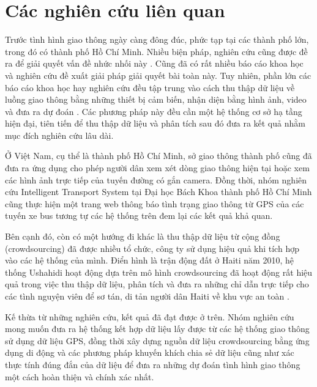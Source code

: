 \section{Các nghiên cứu liên quan}
Trước tình hình giao thông ngày càng đông đúc, phức tạp tại các thành phố lớn, trong đó có thành phố Hồ Chí Minh. Nhiều biện pháp, nghiên cứu cũng được đề ra để giải quyết vấn đề nhức nhối này \cite{FSPPM}. Cũng đã có rất nhiều báo cáo khoa học và nghiên cứu đề xuất giải pháp giải quyết bài toàn này. Tuy nhiên, phần lớn các báo cáo khoa học hay nghiên cứu đều tập trung vào cách thu thập dữ liệu về luồng giao thông bằng những thiết bị cảm biến, nhận diện bằng hình ảnh, video và đưa ra dự đoán \cite{VEGV} \cite{RTD}. Các phương pháp này đều cần một hệ thống cơ sở hạ tầng hiện đại, tiên tiến để thu thập dữ liệu và phân tích sau đó đưa ra kết quả nhằm mục đích nghiên cứu lâu dài.

Ở Việt Nam, cụ thể là thành phố Hồ Chí Minh, sở giao thông thành phố cũng đã đưa ra ứng dụng \cite{VOVAPP} cho phép người dân xem xét dòng giao thông hiện tại hoặc xem các hình ảnh trực tiếp của tuyến đường có gắn camera. Đồng thời, nhóm nghiên cứu Intelligent Transport System tại Đại học Bách Khoa thành phố Hồ Chí Minh cũng thực hiện một trang web \cite{HCMUT} thông báo tình trạng giao thông từ GPS của các tuyến xe bus tương tự các hệ thống trên đem lại các kết quả khả quan.

Bên cạnh đó, còn có một hướng đi khác là thu thập dữ liệu từ cộng đồng (crowdsourcing) đã được nhiều tổ chức, công ty \cite{16} sử dụng hiệu quả khi tích hợp vào các hệ thống của mình. Điển hình là trận động đất ở Haiti năm 2010, hệ thống Ushahidi hoạt động dựa trên mô hình crowdsourcing đã hoạt động rất hiệu quả trong việc thu thập dữ liệu, phân tích và đưa ra những chỉ dẫn trực tiếp cho các tình nguyện viên để sơ tán, di tản người dân Haiti về khu vực an toàn \cite{23} \cite{24}.

Kế thừa từ những nghiên cứu, kết quả đã đạt được ở trên. Nhóm nghiên cứu mong muốn đưa ra hệ thống kết hợp dữ liệu lấy được từ các hệ thống giao thông sử dụng dữ liệu GPS, đồng thời xây dựng nguồn dữ liệu crowdsourcing bằng ứng dụng di động và các phương pháp khuyến khích chia sẻ dữ liệu cũng như xác thực tính đúng đắn của dữ liệu để đưa ra những dự đoán tình hình giao thông một cách hoàn thiện và chính xác nhất. 